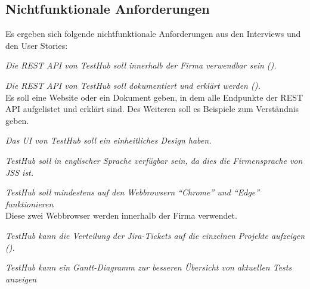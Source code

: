 \subsection{Nichtfunktionale Anforderungen}\label{sec:nfas}
Es ergeben sich folgende nichtfunktionale Anforderungen aus den Interviews und 
den User Stories:

\begin{description}

    \textit{Die REST API von TestHub soll innerhalb der Firma verwendbar sein ().}

    \textit{Die REST API von TestHub soll dokumentiert und erklärt werden ().}\\
    Es soll eine Website oder ein Dokument geben, in dem alle Endpunkte der REST API
    aufgelistet und erklärt sind. Des Weiteren soll es Beispiele zum 
    Verständnis geben.

    \textit{Das \gls{UI} von TestHub soll ein einheitliches Design haben.}

    \textit{TestHub soll in englischer Sprache verfügbar sein, da dies die 
    Firmensprache von JSS ist.}

    \textit{TestHub soll mindestens auf den Webbrowsern ``Chrome'' und ``Edge'' funktionieren}\\
    Diese zwei Webbrowser werden innerhalb der Firma verwendet.


    \textit{TestHub kann die Verteilung der Jira-Tickets auf die einzelnen Projekte 
    aufzeigen ().}

    \textit{TestHub kann ein Gantt-Diagramm zur besseren Übersicht von aktuellen Tests anzeigen}


    
\end{description}